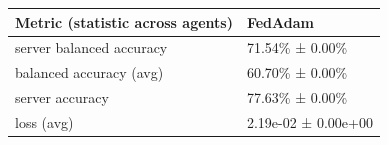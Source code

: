 \begin{tabular}{ll}
\hline
 Metric (statistic across agents)   & FedAdam             \\
\hline
 server balanced accuracy           & 71.54\% ± 0.00\%      \\
 balanced accuracy (avg)            & 60.70\% ± 0.00\%      \\
 server accuracy                    & 77.63\% ± 0.00\%      \\
 loss (avg)                         & 2.19e-02 ± 0.00e+00 \\
\hline
\end{tabular}